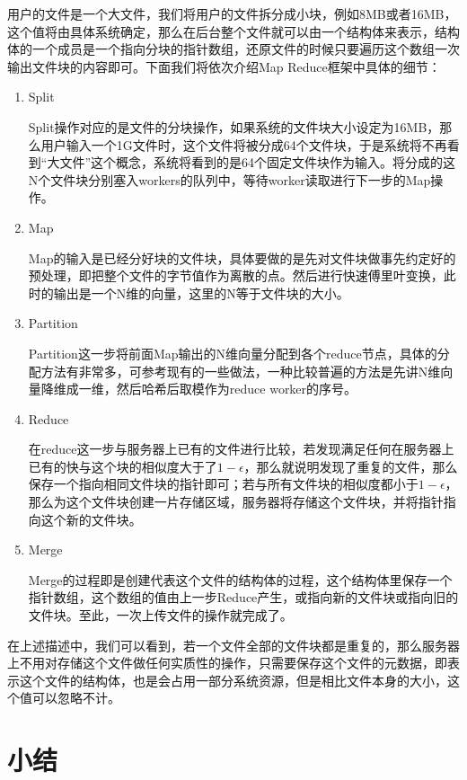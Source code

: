 用户的文件是一个大文件，我们将用户的文件拆分成小块，例如8MB或者16MB，这个值将由具体系统确定，那么在后台整个文件就可以由一个结构体来表示，结构体的一个成员是一个指向分块的指针数组，还原文件的时候只要遍历这个数组一次输出文件块的内容即可。下面我们将依次介绍Map Reduce框架中具体的细节：

\begin{enumerate}
    \item Split

        Split操作对应的是文件的分块操作，如果系统的文件块大小设定为16MB，那么用户输入一个1G文件时，这个文件将被分成64个文件块，于是系统将不再看到“大文件”这个概念，系统将看到的是64个固定文件块作为输入。将分成的这N个文件块分别塞入workers的队列中，等待worker读取进行下一步的Map操作。
    \item Map

        Map的输入是已经分好块的文件块，具体要做的是先对文件块做事先约定好的预处理，即把整个文件的字节值作为离散的点。然后进行快速傅里叶变换，此时的输出是一个N维的向量，这里的N等于文件块的大小。

    \item Partition

        Partition这一步将前面Map输出的N维向量分配到各个reduce节点，具体的分配方法有非常多，可参考现有的一些做法，一种比较普遍的方法是先讲N维向量降维成一维，然后哈希后取模作为reduce worker的序号。
    
    \item Reduce

        在reduce这一步与服务器上已有的文件进行比较，若发现满足任何在服务器上已有的快与这个块的相似度大于了$1-\epsilon$，那么就说明发现了重复的文件，那么保存一个指向相同文件块的指针即可；若与所有文件块的相似度都小于$1-\epsilon$，那么为这个文件块创建一片存储区域，服务器将存储这个文件块，并将指针指向这个新的文件块。

    \item Merge

        Merge的过程即是创建代表这个文件的结构体的过程，这个结构体里保存一个指针数组，这个数组的值由上一步Reduce产生，或指向新的文件块或指向旧的文件块。至此，一次上传文件的操作就完成了。
\end{enumerate}

在上述描述中，我们可以看到，若一个文件全部的文件块都是重复的，那么服务器上不用对存储这个文件做任何实质性的操作，只需要保存这个文件的元数据，即表示这个文件的结构体，也是会占用一部分系统资源，但是相比文件本身的大小，这个值可以忽略不计。

\section{小结}
\label{sec:conclusion}

